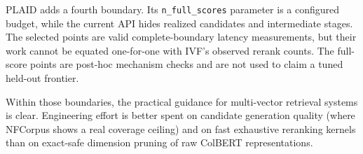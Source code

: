 PLAID adds a fourth boundary. Its \texttt{n\_full\_scores} parameter is a
configured budget, while the current API hides realized candidates and
intermediate stages. The selected points are valid complete-boundary latency
measurements, but their work cannot be equated one-for-one with IVF's observed
rerank counts. The full-score points are post-hoc mechanism checks and are not
used to claim a tuned held-out frontier.

Within those boundaries, the practical guidance for multi-vector retrieval
systems is clear. Engineering effort is better spent on candidate generation
quality (where NFCorpus shows a real coverage ceiling) and on fast exhaustive
reranking kernels than on exact-safe dimension pruning of raw ColBERT
representations.
